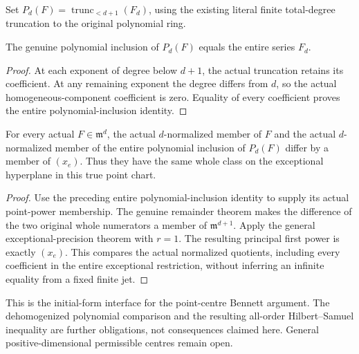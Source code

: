 \begin{definition}
\label{hir:actual-point-initial-homogeneous-polynomial}
\leanok
Set $P_d(F)=\operatorname{trunc}_{<d+1}(F_d)$, using the existing literal
finite total-degree truncation to the original polynomial ring.
\end{definition}

\begin{lemma}
\label{hir:actual-point-initial-polynomial-whole-inclusion}
\leanok
The genuine polynomial inclusion of $P_d(F)$ equals the entire series $F_d$.
\end{lemma}
\begin{proof}
At each exponent of degree below $d+1$, the actual truncation retains its
coefficient. At any remaining exponent the degree differs from $d$, so
the actual homogeneous-component coefficient is zero. Equality of every
coefficient proves the entire polynomial-inclusion identity.
\end{proof}

\begin{theorem}
\label{hir:actual-point-exceptional-initial-polynomial-restriction}
\leanok
For every actual $F\in\mathfrak m^d$, the actual $d$-normalized member
of $F$ and the actual $d$-normalized member of the entire polynomial
inclusion of $P_d(F)$ differ by a member of $(x_e)$. Thus they have the
same whole class on the exceptional hyperplane in this true point chart.
\end{theorem}
\begin{proof}
Use the preceding entire polynomial-inclusion identity to supply its
actual point-power membership. The genuine remainder theorem makes the
difference of the two original whole numerators a member of
$\mathfrak m^{d+1}$. Apply the general exceptional-precision theorem
with $r=1$. The resulting principal first power is exactly $(x_e)$.
This compares the actual normalized quotients, including every coefficient
in the entire exceptional restriction, without inferring an infinite
equality from a fixed finite jet.
\end{proof}

This is the initial-form interface for the point-centre Bennett argument.
The dehomogenized polynomial comparison and the resulting all-order
Hilbert--Samuel inequality are further obligations, not consequences
claimed here. General positive-dimensional permissible centres remain open.
